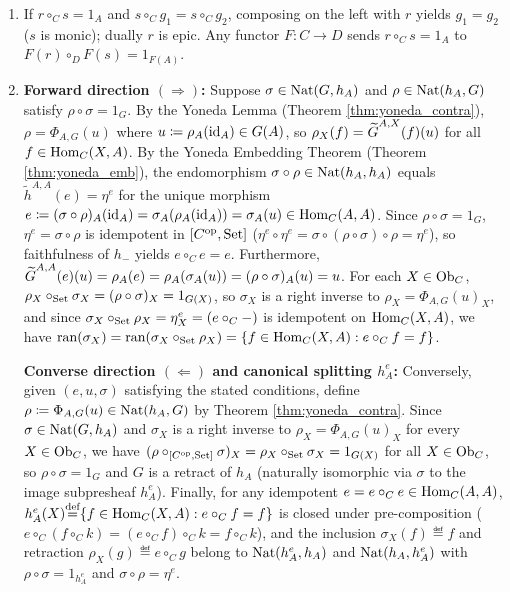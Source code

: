 \documentclass[10pt,a4paper]{article}
\begin{document}
\begin{enumerate}
\item If $r \circ_C s = 1_A$ and $s \circ_C g_1 = s \circ_C g_2$, composing on the left with $r$ yields $g_1 = g_2$ ($s$ is monic); dually $r$ is epic. Any functor $F : C \to D$ sends $r \circ_C s = 1_A$ to $F(r) \circ_D F(s) = 1_{F(A)}$.
\item \textbf{Forward direction $(\Longrightarrow)$:} Suppose $\sigma \in {\textrm{Nat}}(G, h_A)$ and $\rho \in {\textrm{Nat}}(h_A, G)$ satisfy $\rho \circ \sigma = 1_G$. By the Yoneda Lemma (Theorem \ref{thm:yoneda_contra}), $\rho = \Phi_{A,G}(u)$ where $u \coloneqq \rho_A({\textrm{id}}_A) \in G(A)$, so $\rho_X(f) = {\widetilde{G}\textrm{}}^{A,X}(f)(u)$ for all $f \in {\textrm{Hom}}_C(X, A)$. By the Yoneda Embedding Theorem (Theorem \ref{thm:yoneda_emb}), the endomorphism $\sigma \circ \rho \in {\textrm{Nat}}(h_A, h_A)$ equals $\widetilde{h}^{A,A}(e) = \eta^e$ for the unique morphism $e \coloneqq (\sigma \circ \rho)_A({\textrm{id}}_A) = \sigma_A(\rho_A({\textrm{id}}_A)) = \sigma_A(u) \in {\textrm{Hom}}_C(A, A)$. Since $\rho \circ \sigma = 1_G$, $\eta^e = \sigma \circ \rho$ is idempotent in $[C^{\textrm{op}}, {\textrm{Set}}]$ ($\eta^e \circ \eta^e = \sigma \circ (\rho \circ \sigma) \circ \rho = \eta^e$), so faithfulness of $h_-$ yields $e \circ_C e = e$. Furthermore, ${\widetilde{G}\textrm{}}^{A,A}(e)(u) = \rho_A(e) = \rho_A(\sigma_A(u)) = (\rho \circ \sigma)_A(u) = u$. For each $X \in {\textrm{Ob}}_C$, $\rho_X \circ_{\textrm{Set}} \sigma_X = (\rho \circ \sigma)_X = 1_{G(X)}$, so $\sigma_X$ is a right inverse to $\rho_X = \Phi_{A,G}(u)_X$, and since $\sigma_X \circ_{\textrm{Set}} \rho_X = \eta^e_X = (e \circ_C -)$ is idempotent on ${\textrm{Hom}}_C(X, A)$, we have ${\textrm{ran}}(\sigma_X) = {\textrm{ran}}(\sigma_X \circ_{\textrm{Set}} \rho_X) = \{f \in {\textrm{Hom}}_C(X,A) : e \circ_C f = f\}$.

\textbf{Converse direction $(\Longleftarrow)$ and canonical splitting $h_A^e$:} Conversely, given $(e, u, \sigma)$ satisfying the stated conditions, define $\rho \coloneqq \Phi_{A,G}(u) \in {\textrm{Nat}}(h_A, G)$ by Theorem \ref{thm:yoneda_contra}. Since $\sigma \in {\textrm{Nat}}(G, h_A)$ and $\sigma_X$ is a right inverse to $\rho_X = \Phi_{A,G}(u)_X$ for every $X \in {\textrm{Ob}}_C$, we have $(\rho \circ_{[C^{\textrm{op}},{\textrm{Set}}]} \sigma)_X = \rho_X \circ_{\textrm{Set}} \sigma_X = 1_{G(X)}$ for all $X \in {\textrm{Ob}}_C$, so $\rho \circ \sigma = 1_G$ and $G$ is a retract of $h_A$ (naturally isomorphic via $\sigma$ to the image subpresheaf $h_A^e$). Finally, for any idempotent $e = e \circ_C e \in {\textrm{Hom}}_C(A, A)$, $h_A^e(X) {\stackrel{{\textrm{def}}}{=}} \{f \in {\textrm{Hom}}_C(X, A) : e \circ_C f = f\}$ is closed under pre-composition ($e \circ_C (f \circ_C k) = (e \circ_C f) \circ_C k = f \circ_C k$), and the inclusion $\sigma_X(f) \eqdef f$ and retraction $\rho_X(g) \eqdef e \circ_C g$ belong to ${\textrm{Nat}}(h_A^e, h_A)$ and ${\textrm{Nat}}(h_A, h_A^e)$ with $\rho \circ \sigma = 1_{h_A^e}$ and $\sigma \circ \rho = \eta^e$.
\end{enumerate}
\myqed
\end{document}

